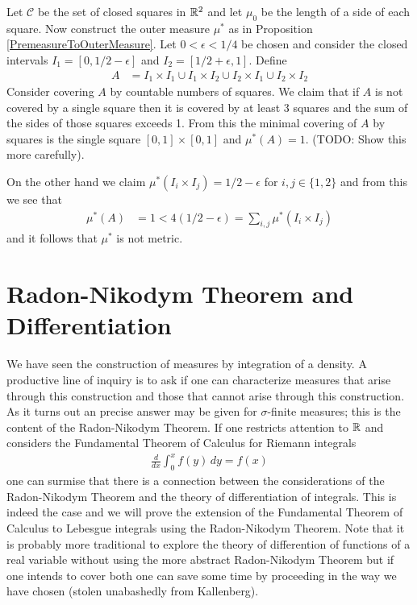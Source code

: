 \begin{examp}\label{NonMetricOuterMeasure}Let $\mathcal{C}$ be the set of closed squares in $\mathbb{R}^2$ and let
$\mu_0$ be the length of a side of each square.  Now construct the outer measure $\mu^*$ as in 
Proposition \ref{PremeasureToOuterMeasure}.  Let $0 < \epsilon < 1/4$ be chosen and 
consider the closed intervals $I_1 = [0, 1/2 - \epsilon]$ and $I_2 = [1/2+\epsilon, 1]$.  Define
\begin{align*}
A &= I_1 \times I_1 \cup I_1 \times I_2 \cup I_2 \times I_1 \cup I_2 \times I_2
\end{align*}
Consider covering $A$ by countable numbers of squares.  We claim that if $A$ is not covered 
by a single square then it is covered by at least 3 squares and the sum of the sides of those squares
exceeds 1.  From this the minimal covering of $A$ by squares is the single square $[0,1] \times [0,1]$ and
$\mu^*(A) = 1$.  (TODO: Show this more carefully).

On the other hand we claim $\mu^*(I_i \times I_j) = 1/2 - \epsilon$ for $i,j \in \lbrace 1, 2 \rbrace$
and from this we see that 
\begin{align*}
\mu^*(A) &= 1 < 4(1/2 - \epsilon) = \sum_{i,j} \mu^*(I_i \times I_j)
\end{align*}
and it follows that $\mu^*$ is not metric.
\end{examp}


\section{Radon-Nikodym Theorem and Differentiation}
We have seen the construction of measures by integration of a
density.  A productive line of inquiry is to ask if one can
characterize measures that arise through this construction and those
that cannot arise through this construction.  As it
turns out an precise answer may be given for $\sigma$-finite measures;
this is the content of the Radon-Nikodym Theorem.  If one restricts
attention to $\mathbb{R}$ and considers the Fundamental Theorem of
Calculus for Riemann integrals
\begin{align*}
\frac{d}{dx} \int_0^x f(y) \, dy = f(x)
\end{align*}
one can surmise that there is a connection between the considerations
of the Radon-Nikodym Theorem and the theory of differentiation of
integrals.  This is indeed the case and we will prove the extension of
the Fundamental Theorem of Calculus to Lebesgue integrals using the
Radon-Nikodym Theorem.  Note that it is probably more traditional to
explore the theory of differention of functions of a real variable
without using the more abstract Radon-Nikodym Theorem but if one
intends to cover both one can save some time by proceeding in the way
we have chosen (stolen unabashedly from Kallenberg).

